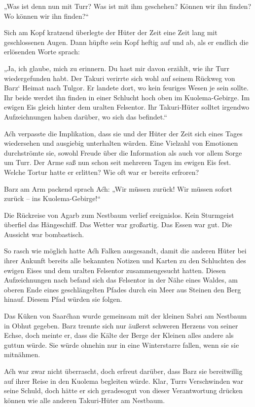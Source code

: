 „Was ist denn nun mit Turr? Was ist mit ihm geschehen? Können wir ihn finden? Wo können wir ihn finden?“

Sich am Kopf kratzend überlegte der Hüter der Zeit eine Zeit lang mit geschlossenen Augen. Dann hüpfte sein Kopf heftig auf und ab, als er endlich die erlösenden Worte sprach:

„Ja, ich glaube, mich zu erinnern. Du hast mir davon erzählt, wie ihr Turr wiedergefunden habt. Der Takuri verirrte sich wohl auf seinem Rückweg von Barz‘ Heimat nach Tulgor. Er landete dort, wo kein feuriges Wesen je sein sollte. Ihr beide werdet ihn finden in einer Schlucht hoch oben im Kuolema-Gebirge. Im ewigen Eis gleich hinter dem uralten Felsentor. Ihr Takuri-Hüter solltet irgendwo Aufzeichnungen haben darüber, wo sich das befindet.“

Aćh verpasste die Implikation, dass sie und der Hüter der Zeit sich eines Tages wiedersehen und ausgiebig unterhalten würden. Eine Vielzahl von Emotionen durchströmte sie, sowohl Freude über die Information als auch vor allem Sorge um Turr. Der Arme saß nun schon seit mehreren Tagen im ewigen Eis fest. Welche Tortur hatte er erlitten? Wie oft war er bereits erfroren?

Barz am Arm packend sprach Aćh: „Wir müssen zurück! Wir müssen sofort zurück – ins Kuolema-Gebirge!“\bigskip







Die Rückreise von Agarb zum Nestbaum verlief ereignislos. Kein Sturmgeist überfiel das Hängeschiff. Das Wetter war großartig. Das Essen war gut. Die Aussicht war bombastisch.

So rasch wie möglich hatte Aćh Falken ausgesandt, damit die anderen Hüter bei ihrer Ankunft bereits alle bekannten Notizen und Karten zu den Schluchten des ewigen Eises und dem uralten Felsentor zusammengesucht hatten. Diesen Aufzeichnungen nach befand sich das Felsentor in der Nähe eines Waldes, am oberen Ende eines geschlängelten Pfades durch ein Meer aus Steinen den Berg hinauf. Diesem Pfad würden sie folgen.

Das Küken von Saarćhan wurde gemeinsam mit der kleinen Sabri am Nestbaum in Obhut gegeben. Barz trennte sich nur äußerst schweren Herzens von seiner Echse, doch meinte er, dass die Kälte der Berge der Kleinen alles andere als guttun würde. Sie würde ohnehin nur in eine Winterstarre fallen, wenn sie sie mitnähmen.

Aćh war zwar nicht überrascht, doch erfreut darüber, dass Barz sie bereitwillig auf ihrer Reise in den Kuolema begleiten würde. Klar, Turrs Verschwinden war seine Schuld, doch hätte er sich geradesogut von dieser Verantwortung drücken können wie alle anderen Takuri-Hüter am Nestbaum.

